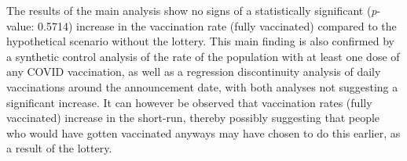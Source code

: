\documentclass{scrbook}
\begin{document}
The results of the main analysis show no signs of a statistically
significant (\textit{p}-value: 0.5714) increase in the vaccination rate
(fully vaccinated) compared to the hypothetical scenario without the
lottery. This main finding is also confirmed by a synthetic control
analysis of the rate of the population with at least one dose of any
COVID vaccination, as well as a regression discontinuity analysis of
daily vaccinations around the announcement date, with both analyses not
suggesting a significant increase. It can however be observed that
vaccination rates (fully vaccinated) increase in the short-run, thereby
possibly suggesting that people who would have gotten vaccinated anyways
may have chosen to do this earlier, as a result of the lottery.

\end{document}
